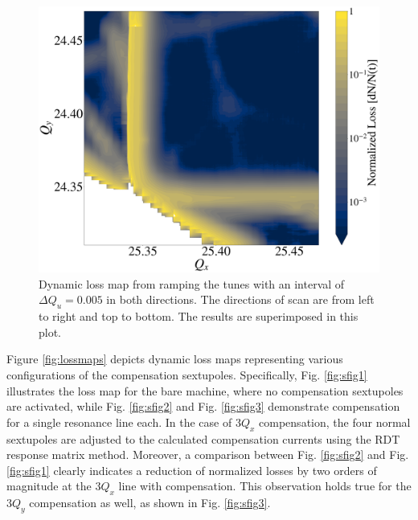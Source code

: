 \begin{figure}[H]
    \centering
    \includegraphics[width=\columnwidth]{chapter4/bare.png}
    \caption{Dynamic loss map from ramping the tunes with an interval of $\Delta Q_u=0.005$ in both directions. The directions of scan are from left to right and top to bottom. The results are superimposed in this plot.}
    \label{fig:bare_nocomments}
\end{figure}

Figure \ref{fig:lossmaps} depicts dynamic loss maps representing various configurations of the compensation sextupoles. Specifically, Fig. \ref{fig:sfig1} illustrates the loss map for the bare machine, where no compensation sextupoles are activated, while Fig. \ref{fig:sfig2} and Fig. \ref{fig:sfig3} demonstrate compensation for a single resonance line each. In the case of $3Q_x$ compensation, the four normal sextupoles are adjusted to the calculated compensation currents using the RDT response matrix method. Moreover, a comparison between Fig. \ref{fig:sfig2} and Fig. \ref{fig:sfig1} clearly indicates a reduction of normalized losses by two orders of magnitude at the $3Q_x$ line with compensation. This observation holds true for the $3Q_y$ compensation as well, as shown in Fig. \ref{fig:sfig3}.

